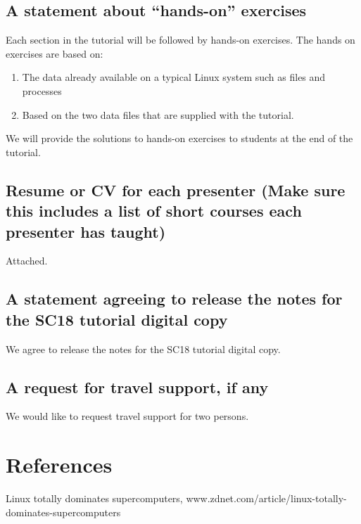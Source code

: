 \documentclass{report}
\begin{document}
\subsection*{A statement about ``hands-on'' exercises}
Each section in the tutorial will be followed by hands-on exercises. The hands on exercises are based on:
\begin{enumerate}
\item The data already available on a
typical Linux system such as files and processes
\item Based on the two data
files that are supplied with the tutorial.
\end{enumerate}
We will provide the solutions to hands-on exercises to students at the end of the tutorial.

\subsection*{Resume or CV for each presenter (Make sure this includes a list of short courses each presenter has taught)}
Attached.
\subsection*{A statement agreeing to release the notes for the SC18 tutorial digital copy}
We agree to release the notes for the SC18 tutorial digital copy.

\subsection*{A request for travel support, if any}
We would like to request travel support for two persons.

\section*{References}

\noindent [1] Linux totally dominates supercomputers, www.zdnet.com/article/linux-totally-dominates-supercomputers 
\end{document}

